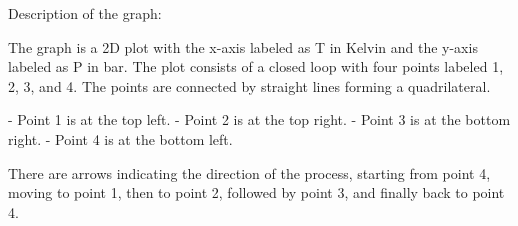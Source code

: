 Description of the graph:

The graph is a 2D plot with the x-axis labeled as T in Kelvin and the y-axis labeled as P in bar. The plot consists of a closed loop with four points labeled 1, 2, 3, and 4. The points are connected by straight lines forming a quadrilateral.

- Point 1 is at the top left.
- Point 2 is at the top right.
- Point 3 is at the bottom right.
- Point 4 is at the bottom left.

There are arrows indicating the direction of the process, starting from point 4, moving to point 1, then to point 2, followed by point 3, and finally back to point 4.
